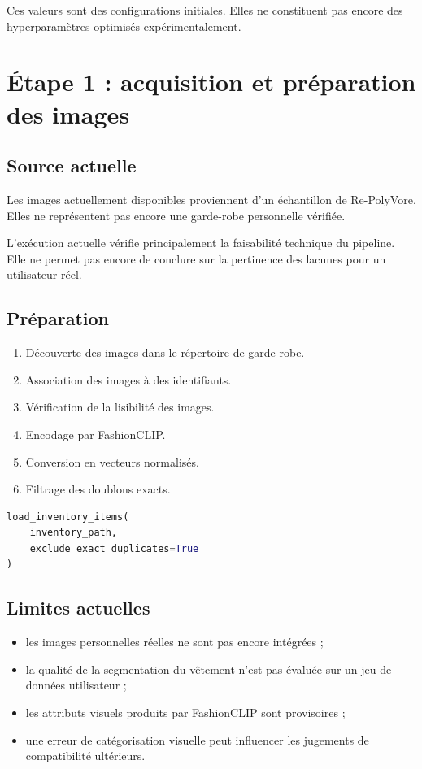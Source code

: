 \documentclass[11pt,a4paper]{article}
\begin{document}
Ces valeurs sont des configurations initiales. Elles ne constituent pas encore
des hyperparamètres optimisés expérimentalement.

\section{Étape 1 : acquisition et préparation des images}

\subsection{Source actuelle}

Les images actuellement disponibles proviennent d'un échantillon de
Re-PolyVore. Elles ne représentent pas encore une garde-robe personnelle
vérifiée.

L'exécution actuelle vérifie principalement la faisabilité technique du
pipeline. Elle ne permet pas encore de conclure sur la pertinence des lacunes
pour un utilisateur réel.

\subsection{Préparation}

\begin{enumerate}[leftmargin=*]
    \item Découverte des images dans le répertoire de garde-robe.
    \item Association des images à des identifiants.
    \item Vérification de la lisibilité des images.
    \item Encodage par FashionCLIP.
    \item Conversion en vecteurs normalisés.
    \item Filtrage des doublons exacts.
\end{enumerate}

\begin{lstlisting}[language=Python]
load_inventory_items(
    inventory_path,
    exclude_exact_duplicates=True
)
\end{lstlisting}

\subsection{Limites actuelles}

\begin{itemize}[leftmargin=*]
    \item les images personnelles réelles ne sont pas encore intégrées ;
    \item la qualité de la segmentation du vêtement n'est pas évaluée sur un
    jeu de données utilisateur ;
    \item les attributs visuels produits par FashionCLIP sont provisoires ;
    \item une erreur de catégorisation visuelle peut influencer les jugements
    de compatibilité ultérieurs.
\end{itemize}
\end{document}
